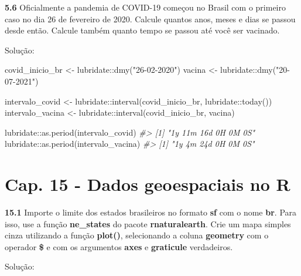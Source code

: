 \documentclass[
]{book}
\newenvironment{Shaded}{\begin{snugshade}}{\end{snugshade}}
\newcommand{\AttributeTok}[1]{\textcolor[rgb]{0.77,0.63,0.00}{#1}}
\newcommand{\CommentTok}[1]{\textcolor[rgb]{0.56,0.35,0.01}{\textit{#1}}}
\newcommand{\ConstantTok}[1]{\textcolor[rgb]{0.00,0.00,0.00}{#1}}
\newcommand{\FunctionTok}[1]{\textcolor[rgb]{0.00,0.00,0.00}{#1}}
\newcommand{\NormalTok}[1]{#1}
\newcommand{\OtherTok}[1]{\textcolor[rgb]{0.56,0.35,0.01}{#1}}
\newcommand{\SpecialCharTok}[1]{\textcolor[rgb]{0.00,0.00,0.00}{#1}}
\newcommand{\StringTok}[1]{\textcolor[rgb]{0.31,0.60,0.02}{#1}}
\begin{document}
\textbf{5.6}
Oficialmente a pandemia de COVID-19 começou no Brasil com o primeiro caso no dia 26 de fevereiro de 2020. Calcule quantos anos, meses e dias se passou desde então. Calcule também quanto tempo se passou até você ser vacinado.

Solução:

\begin{Shaded}
\begin{Highlighting}[]
\NormalTok{covid\_inicio\_br }\OtherTok{\textless{}{-}}\NormalTok{ lubridate}\SpecialCharTok{::}\FunctionTok{dmy}\NormalTok{(}\StringTok{"26{-}02{-}2020"}\NormalTok{)}
\NormalTok{vacina }\OtherTok{\textless{}{-}}\NormalTok{ lubridate}\SpecialCharTok{::}\FunctionTok{dmy}\NormalTok{(}\StringTok{"20{-}07{-}2021"}\NormalTok{)}

\NormalTok{intervalo\_covid }\OtherTok{\textless{}{-}}\NormalTok{ lubridate}\SpecialCharTok{::}\FunctionTok{interval}\NormalTok{(covid\_inicio\_br, lubridate}\SpecialCharTok{::}\FunctionTok{today}\NormalTok{())}
\NormalTok{intervalo\_vacina }\OtherTok{\textless{}{-}}\NormalTok{ lubridate}\SpecialCharTok{::}\FunctionTok{interval}\NormalTok{(covid\_inicio\_br, vacina)}

\NormalTok{lubridate}\SpecialCharTok{::}\FunctionTok{as.period}\NormalTok{(intervalo\_covid)}
\CommentTok{\#\textgreater{} [1] "1y 11m 16d 0H 0M 0S"}
\NormalTok{lubridate}\SpecialCharTok{::}\FunctionTok{as.period}\NormalTok{(intervalo\_vacina)}
\CommentTok{\#\textgreater{} [1] "1y 4m 24d 0H 0M 0S"}
\end{Highlighting}
\end{Shaded}

\hypertarget{cap.-15---dados-geoespaciais-no-r}{%
\chapter*{Cap. 15 - Dados geoespaciais no R}\label{cap.-15---dados-geoespaciais-no-r}}

\textbf{15.1}
Importe o limite dos estados brasileiros no formato \textbf{sf} com o nome \textbf{br}. Para isso, use a função \textbf{ne\_states} do pacote \textbf{rnaturalearth}. Crie um mapa simples cinza utilizando a função \textbf{plot()}, selecionando a coluna \textbf{geometry} com o operador \textbf{\$} e com os argumentos \textbf{axes} e \textbf{graticule} verdadeiros.

Solução:

\begin{Shaded}
\end{Shaded}
\end{document}
